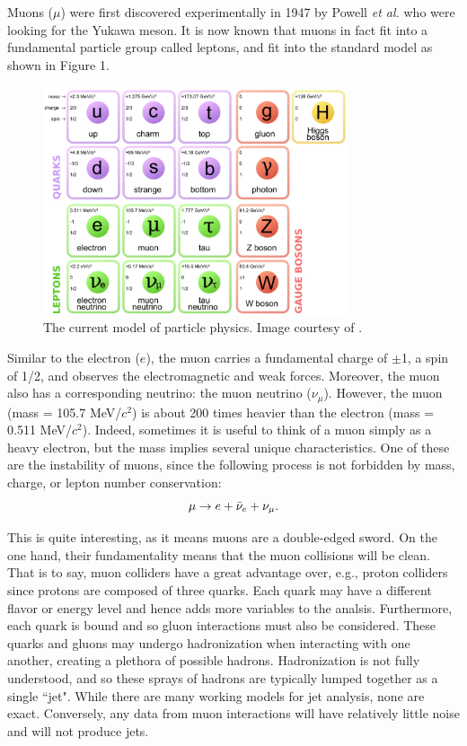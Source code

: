  \par
Muons ($\mu$) were first discovered experimentally in 1947 by Powell \emph{et al.} \cite{griffithspp} who were looking for the Yukawa meson.
It is now known that muons in fact fit into a fundamental particle group called leptons, and fit into the standard model as shown in Figure 1.

\begin{figure}[h!]
\label{fig:standardmodel}
\centering
\includegraphics[width=0.8\textwidth]{Figures/standardmodel.jpg} 
 \caption{The current model of particle physics. Image courtesy of \cite{quantumdiaries}.}
\end{figure}

Similar to the electron ($e$), the muon carries a fundamental charge of $\pm$1, a spin of 1/2, and observes the electromagnetic and weak forces. Moreover, the muon also has a corresponding neutrino: the muon neutrino ($\nu_\mu$). However, the muon (mass = 105.7 MeV/$c^2$) is about 200 times heavier than the electron (mass = 0.511 MeV/$c^2$). Indeed, sometimes it is useful to think of a muon simply as a heavy electron, but the mass implies several unique characteristics. One of these are the instability of muons, since the following process is not forbidden by mass, charge, or lepton number conservation:
\begin{equation} \nonumber
\mu \rightarrow e+\bar{\nu}_e+\nu_\mu.\\
\end{equation}

This is quite interesting, as it means muons are a double-edged sword. On the one hand, their fundamentality means that the muon collisions will be clean. That is to say, muon colliders have a great advantage over, e.g., proton colliders since protons are composed of three quarks. Each quark may have a different flavor or energy level and hence adds more variables to the analsis. Furthermore, each quark is bound and so gluon interactions must also be considered. These quarks and gluons may undergo hadronization when interacting with one another, creating a plethora of possible hadrons. Hadronization is not fully understood, and so these sprays of hadrons are typically lumped together as a single ``jet". While there are many working models for jet analysis, none are exact. Conversely, any data from muon interactions will have relatively little noise and will not produce jets.

